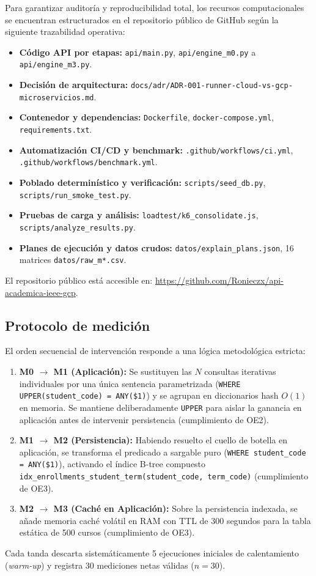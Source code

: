 \documentclass[conference]{IEEEtran}
\begin{document}
Para garantizar auditoría y reproducibilidad total, los recursos computacionales se encuentran estructurados en el repositorio público de GitHub según la siguiente trazabilidad operativa:
\begin{itemize}
    \setlength{\itemsep}{0.5pt}
    \setlength{\parskip}{0pt}
    \item \textbf{Código API por etapas:} \texttt{api/main.py}, \texttt{api/engine\_m0.py} a \texttt{api/engine\_m3.py}.
    \item \textbf{Decisión de arquitectura:} \texttt{docs/adr/ADR-001-runner-cloud-vs-gcp-microservicios.md}.
    \item \textbf{Contenedor y dependencias:} \texttt{Dockerfile}, \texttt{docker-compose.yml}, \texttt{requirements.txt}.
    \item \textbf{Automatización CI/CD y benchmark:} \texttt{.github/workflows/ci.yml}, \texttt{.github/workflows/benchmark.yml}.
    \item \textbf{Poblado determinístico y verificación:} \texttt{scripts/seed\_db.py}, \texttt{scripts/run\_smoke\_test.py}.
    \item \textbf{Pruebas de carga y análisis:} \texttt{loadtest/k6\_consolidate.js}, \texttt{scripts/analyze\_results.py}.
    \item \textbf{Planes de ejecución y datos crudos:} \texttt{datos/explain\_plans.json}, 16 matrices \texttt{datos/raw\_m*.csv}.
\end{itemize}
El repositorio público está accesible en: \url{https://github.com/Ronieczx/api-academica-ieee-gcp}.

\subsection{Protocolo de medición}
El orden secuencial de intervención responde a una lógica metodológica estricta:
\begin{enumerate}
    \setlength{\itemsep}{1pt}
    \setlength{\parskip}{0pt}
    \item \textbf{M0 $\to$ M1 (Aplicación):} Se sustituyen las $N$ consultas iterativas individuales por una única sentencia parametrizada (\texttt{WHERE UPPER(student\_code) = ANY(\$1)}) y se agrupan en diccionarios hash $O(1)$ en memoria. Se mantiene deliberadamente \texttt{UPPER} para aislar la ganancia en aplicación antes de intervenir persistencia (cumplimiento de OE2).
    \item \textbf{M1 $\to$ M2 (Persistencia):} Habiendo resuelto el cuello de botella en aplicación, se transforma el predicado a sargable puro (\texttt{WHERE student\_code = ANY(\$1)}), activando el índice B-tree compuesto \texttt{idx\_enrollments\_student\_term(student\_code, term\_code)} (cumplimiento de OE3).
    \item \textbf{M2 $\to$ M3 (Caché en Aplicación):} Sobre la persistencia indexada, se añade memoria caché volátil en RAM con TTL de 300 segundos para la tabla estática de 500 cursos (cumplimiento de OE3).
\end{enumerate}
Cada tanda descarta sistemáticamente 5 ejecuciones iniciales de calentamiento (\textit{warm-up}) y registra 30 mediciones netas válidas ($n=30$).
\end{document}
